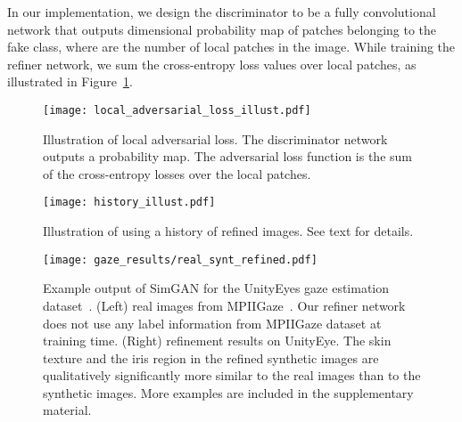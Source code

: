 \documentclass[10pt,twocolumn,letterpaper]{article}
\begin{document}
In our implementation, we design the discriminator  to be a fully convolutional network that outputs  dimensional probability map of patches belonging to the fake class, where  are the number of local patches in the image. While training the refiner network, we sum the cross-entropy loss values over   local patches, as illustrated in Figure~\ref{fig:local_adversarial_loss_illust}. 




\begin{figure}[t]
\vspace{-0.2cm}
\centering
\texttt{[image: local\_adversarial\_loss\_illust.pdf]} \\
\caption{Illustration of local adversarial loss. 
The discriminator network outputs a  probability map.
The adversarial loss function is the sum of the cross-entropy losses over the local patches.  
}
\label{fig:local_adversarial_loss_illust}
\end{figure}


\begin{figure}[t]
\centering
\texttt{[image: history\_illust.pdf]} \\
\caption{Illustration of using a history of refined images. See text for details.
}
\label{fig:history_illust}
\end{figure}



\begin{figure*}[t]
\centering
\texttt{[image: gaze\_results/real\_synt\_refined.pdf]} 
\caption{Example output of SimGAN for the UnityEyes gaze estimation dataset~\cite{Wood16}. 
(Left) real images from MPIIGaze~\cite{Zhang15a}. 
Our refiner network does not use any label information from MPIIGaze dataset at training time. 
(Right) refinement results on UnityEye. 
The skin texture and the iris region in the refined synthetic images are qualitatively significantly more similar to the real images than to the synthetic images.
More examples are included in the supplementary material.
}
\label{fig:results_qualitative_gaze}
\vspace{-0.2cm}
\end{figure*}
\end{document}
